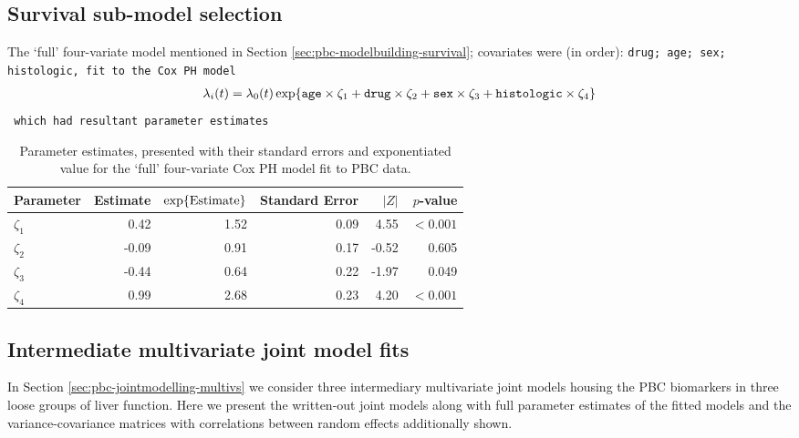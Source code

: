 \subsection{Survival sub-model selection}\label{sec:appendix-PBC-surv}
The `full' four-variate model mentioned in Section \ref{sec:pbc-modelbuilding-survival}; covariates were (in order): \tt{drug}; \tt{age}; \tt{sex}; \tt{histologic}, fit to the Cox PH model
  \begin{align}
      \lambda_i(t)=\lambda_0(t)\exp\!\left\{\texttt{age}\times\zeta_1+\texttt{drug}\times\zeta_2+\texttt{sex}\times\zeta_3+\texttt{histologic}\times\zeta_4\right\}
  \label{eq:PBC-surv-fourvariate}
  \end{align}
which had resultant parameter estimates
 \begin{table}[ht]
    \centering
    \captionsetup{font=scriptsize}
    \begin{tabular}{l|rrrrr}
    Parameter & Estimate & $\exp\!\left\{\mathrm{Estimate}\right\}$ & Standard Error & $|Z|$ & $p$-value \\ 
    \hline
    $\zeta_1$ & 0.42 & 1.52 & 0.09 & 4.55 & $<0.001$ \\ 
    $\zeta_2$ & -0.09 & 0.91 & 0.17 & -0.52 & 0.605 \\ 
    $\zeta_3$ & -0.44 & 0.64 & 0.22 & -1.97 & 0.049 \\ 
    $\zeta_4$ & 0.99 & 2.68 & 0.23 & 4.20 & $<0.001$ \\ 
    \hline
  \end{tabular}
  \caption{Parameter estimates, presented with their standard errors and exponentiated value for the `full' four-variate Cox PH model fit to PBC data.}
  \label{tab:appendix-PBC-surv-fourvar}
  \end{table}

\subsection{Intermediate multivariate joint model fits}\label{sec:appendix-PBC-multivs}
In Section \ref{sec:pbc-jointmodelling-multivs} we consider three intermediary multivariate joint models housing the PBC biomarkers in three loose groups of liver function. Here we present the written-out joint models along with full parameter estimates of the fitted models and the variance-covariance matrices with correlations between random effects additionally shown.

